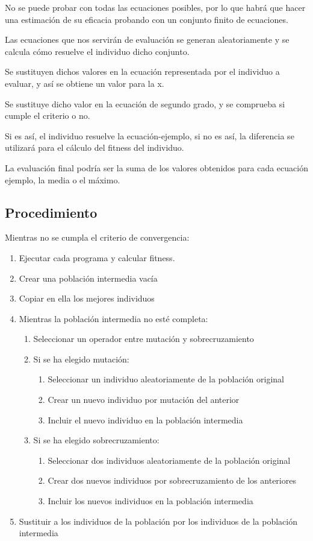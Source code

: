 \documentclass[12pt, twoside, openright]{report} %
\begin{document}
No se puede probar con todas las ecuaciones posibles, por lo que habrá que hacer una estimación de su eficacia probando con un conjunto finito de ecuaciones.

Las ecuaciones que nos servirán de evaluación se generan aleatoriamente y se calcula cómo resuelve el individuo dicho conjunto.

Se sustituyen dichos valores en la ecuación representada por el individuo a evaluar, y así se obtiene un valor para la x.

Se sustituye dicho valor en la ecuación de segundo grado, y se comprueba si cumple el criterio o no.

Si es así, el individuo resuelve la ecuación-ejemplo, si no es así, la diferencia se utilizará para el cálculo del ﬁtness del individuo.

La evaluación final podría ser la suma de los valores obtenidos para cada ecuación ejemplo, la media o el máximo.

\subsection{Procedimiento}
Mientras no se cumpla el criterio de convergencia:
\begin{enumerate}
	\item Ejecutar cada programa y calcular fitness.
	\item Crear una población intermedia vacía
	\item Copiar en ella los mejores individuos
	\item Mientras la población intermedia no esté completa:
	\begin{enumerate}
		\item Seleccionar un operador entre mutación y sobrecruzamiento
		\item Si se ha elegido mutación:
		\begin{enumerate}
			\item Seleccionar un individuo aleatoriamente de la población
			original
			\item Crear un nuevo individuo por mutación del anterior
			\item Incluir el nuevo individuo en la población intermedia
		\end{enumerate}
		\item Si se ha elegido sobrecruzamiento:
		\begin{enumerate}
			\item Seleccionar dos individuos aleatoriamente de la población original
			\item Crear dos nuevos individuos por sobrecruzamiento de los
			anteriores
			\item Incluir los nuevos individuos en la población intermedia
		\end{enumerate}
	\end{enumerate}
	
	\item Sustituir a los individuos de la población por los individuos de
	la población intermedia
\end{enumerate}
\end{document}
